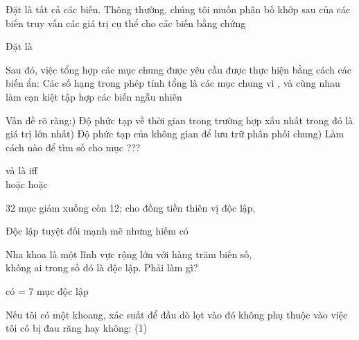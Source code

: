 \documentclass{article}
\begin{document}
\begin{huge}

Đặt  là tất cả các biến. Thông thường, chúng tôi muốn \al
  phân bố khớp sau của các biến truy vấn  \al
  các giá trị cụ thể  cho các biến bằng chứng  

Đặt  là 

Sau đó, việc tổng hợp các mục chung được yêu cầu được thực hiện bằng cách 
các biến ẩn:
\mat{\[
\pv(\mbf{Y}|\mbf{E}\eq \mbf{e}) = \alpha \pv(\mbf{Y},\mbf{E}\eq \mbf{e})
= \alpha \mysum_{\smbf{h}} \pv(\mbf{Y},\mbf{E}\eq \mbf{e},\mbf{H}\eq \mbf{h})
\]}
Các số hạng trong phép tính tổng là các mục chung vì ,  và  cùng nhau làm cạn kiệt tập hợp các biến ngẫu nhiên

Vấn đề rõ ràng:) Độ phức tạp về thời gian trong trường hợp xấu nhất  trong đó  là giá trị lớn nhất) Độ phức tạp của không gian  để lưu trữ phân phối chung) Làm cách nào để tìm số cho mục ???



 và  là  iff\\
 \quad hoặc \quad {} \quad hoặc \quad {}

\textwidth
{}

\nl
{}

32 mục giảm xuống còn 12; cho  đồng tiền thiên vị độc lập, 

Độc lập tuyệt đối mạnh mẽ nhưng hiếm có

Nha khoa là một lĩnh vực rộng lớn với hàng trăm biến số,\\
không ai trong số đó là độc lập. Phải làm gì?


 có  = 7 mục độc lập

Nếu tôi có một khoang, xác suất để đầu dò lọt vào đó
không phụ thuộc vào việc tôi có bị đau răng hay không:\al
  (1) 


\end{huge}
\end{document}
